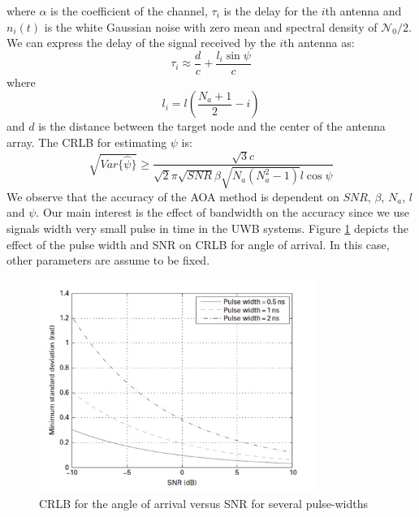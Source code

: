 \documentclass[\main/main.tex]{subfiles}
\begin{document}
where $\alpha$ is the coefficient of the channel, $\tau_i$ is the delay for the $i$th antenna and $n_i(t)$ is the white Gaussian noise with zero mean and spectral density of $\mathcal{N}_0/2$. We can express the delay of the signal received by the $i$th antenna as:
\begin{equation}
    \tau_i \approx \frac{d}{c} + \frac{l_i \sin{\psi}}{c}
\end{equation}
where
\begin{equation}
    l_i = l \left( \frac{N_a+1}{2} - i \right)
\end{equation}
and $d$ is the distance between the target node and the center of the antenna array. The CRLB for estimating $\psi$ is:
\begin{equation}
    \sqrt{Var\{\hat{\psi}\}} \geq \frac{\sqrt{3}c}{\sqrt{2}\pi\sqrt{SNR}\beta\sqrt{N_a(N_a^2-1)}l\cos{\psi}}
\end{equation}
We observe that the accuracy of the AOA method is dependent on $SNR$, $\beta$, $N_a$, $l$ and $\psi$. Our main interest is the effect of bandwidth on the accuracy since we use signals width very small pulse in time in the UWB systems. Figure \ref{fig:aoa_crlb_ for_angle_of_arrival_versus_snr} depicts the effect of the pulse width and SNR on CRLB for angle of arrival. In this case, other parameters are assume to be fixed.

\begin{figure}[H]
    \centering
    \includegraphics[width=0.8\textwidth]{aoa_crlb_for_angle_of_arrival_versus_snr}
    \caption{CRLB for the angle of arrival versus SNR for several pulse-widths}
    \label{fig:aoa_crlb_ for_angle_of_arrival_versus_snr}
\end{figure}
\end{document}
